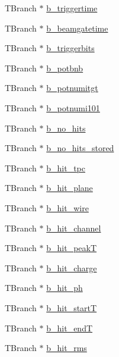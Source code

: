 \begin{DoxyCompactItemize}
\item 
T\-Branch $\ast$ \hyperlink{classanatree_ae056ea0ac78998981ad598acce7c898c}{b\-\_\-triggertime}
\item 
T\-Branch $\ast$ \hyperlink{classanatree_a2361a4c9a52f77105efdc8a5a6474304}{b\-\_\-beamgatetime}
\item 
T\-Branch $\ast$ \hyperlink{classanatree_a17d4d2cfce36b1f8234043c64a764ed2}{b\-\_\-triggerbits}
\item 
T\-Branch $\ast$ \hyperlink{classanatree_ae0efc0a09dcd0178945610bf46c516a3}{b\-\_\-potbnb}
\item 
T\-Branch $\ast$ \hyperlink{classanatree_a89ab4f728c4235eeb1694c13892ecf6f}{b\-\_\-potnumitgt}
\item 
T\-Branch $\ast$ \hyperlink{classanatree_ab8e0563dc3664477ce0a3e1ea7a117ea}{b\-\_\-potnumi101}
\item 
T\-Branch $\ast$ \hyperlink{classanatree_a2601a4d29467cbdc4730f61dd308af05}{b\-\_\-no\-\_\-hits}
\item 
T\-Branch $\ast$ \hyperlink{classanatree_aceb52d7a1fb7f1cb81745cd8c53b5a4e}{b\-\_\-no\-\_\-hits\-\_\-stored}
\item 
T\-Branch $\ast$ \hyperlink{classanatree_a67859ad7bc96571ce3530c930272f51f}{b\-\_\-hit\-\_\-tpc}
\item 
T\-Branch $\ast$ \hyperlink{classanatree_a654417b656f4cbcc3d19de17ef16215f}{b\-\_\-hit\-\_\-plane}
\item 
T\-Branch $\ast$ \hyperlink{classanatree_a60739c0f4c0a4cfc08aef185cfeb6c0d}{b\-\_\-hit\-\_\-wire}
\item 
T\-Branch $\ast$ \hyperlink{classanatree_ad119c94cc8f49447df91dbeff7dd2b00}{b\-\_\-hit\-\_\-channel}
\item 
T\-Branch $\ast$ \hyperlink{classanatree_a9b50cb6896b6b5fe7cd6fdd34f203c5b}{b\-\_\-hit\-\_\-peak\-T}
\item 
T\-Branch $\ast$ \hyperlink{classanatree_a4686c69f1534f07a0696632bd4618c48}{b\-\_\-hit\-\_\-charge}
\item 
T\-Branch $\ast$ \hyperlink{classanatree_a9d5f1e4b0de0ce959688b9586c6a4c43}{b\-\_\-hit\-\_\-ph}
\item 
T\-Branch $\ast$ \hyperlink{classanatree_a0fc7c741599029b9a43342783496488e}{b\-\_\-hit\-\_\-start\-T}
\item 
T\-Branch $\ast$ \hyperlink{classanatree_af2a81e6e09faa3b768a2b6eebe8c9fd2}{b\-\_\-hit\-\_\-end\-T}
\item 
T\-Branch $\ast$ \hyperlink{classanatree_a1afdbd2be4f773ac64546aeaae0893f1}{b\-\_\-hit\-\_\-rms}

\end{DoxyCompactItemize}
